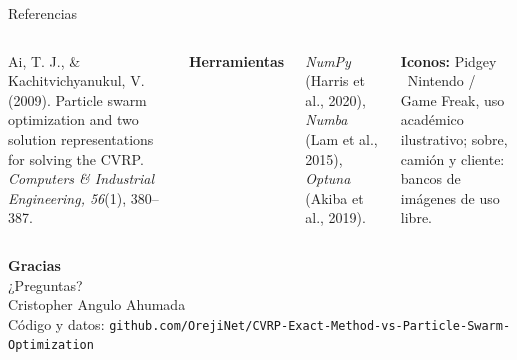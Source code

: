 \documentclass[aspectratio=169, 11pt, xcolor={dvipsnames,table}]{beamer}
\newcommand{\azul}[1]{\textcolor{UsachAzul}{#1}}
\newcommand{\gris}[1]{\textcolor{UsachGris}{#1}}
\begin{document}
\begin{frame}{Referencias}
\begin{columns}[T]
Ai, T. J., \& Kachitvichyanukul, V. (2009). Particle swarm optimization and two solution representations for solving the CVRP. \emph{Computers \& Industrial Engineering, 56}(1), 380--387.\par\medskip
\textbf{Herramientas}\par\smallskip
\emph{NumPy} (Harris et al., 2020), \emph{Numba} (Lam et al., 2015), \emph{Optuna} (Akiba et al., 2019).\par\medskip
{\tiny \gris{\textbf{Iconos:} Pidgey \textcopyright\ Nintendo / Game Freak, uso académico ilustrativo; sobre, camión y cliente: bancos de imágenes de uso libre.}}
\end{columns}
\end{frame}

\begin{frame}[plain]
\vfill\begin{center}
{\Huge\bfseries\azul{Gracias}}\\[10pt]
{\large ¿Preguntas?}\\[18pt]
\footnotesize
Cristopher Angulo Ahumada\\[4pt]
\gris{Código y datos: \texttt{github.com/OrejiNet/CVRP-Exact-Method-vs-Particle-Swarm-Optimization}}
\end{center}\vfill
\end{frame}

\appendix
\end{document}
